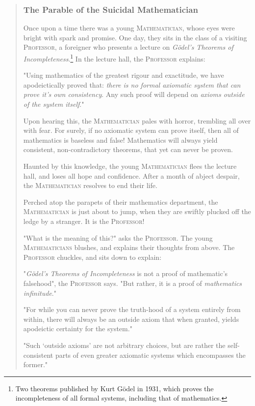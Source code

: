 \begin{quote}
  \subsubsection*{The Parable of the Suicidal Mathematician}
  Once upon a time there was a young \textsc{Mathematician}, whose eyes were bright with spark and promise. One day, they sits in the class of a visiting \textsc{Professor}, a foreigner who presents a lecture on \emph{Gödel's Theorems of Incompleteness}.\footnote{Two theorems published by Kurt Gödel in 1931, which proves the incompleteness of all formal systems, including that of mathematics.} In the lecture hall, the \textsc{Professor} explains:

  "Using mathematics of the greatest rigour and exactitude, we have apodeictically proved that: \emph{there is no formal axiomatic system that can prove it's own consistency}. Any such proof will depend on \emph{axioms outside of the system itself}."

  Upon hearing this, the \textsc{Mathematician} pales with horror, trembling all over with fear. For surely, if no axiomatic system can prove itself, then all of mathematics is baseless and false! Mathematics will always yield consistent, non-contradictory theorems, that yet can never be proven.

  Haunted by this knowledge, the young \textsc{Mathematician} flees the lecture hall, and loses all hope and confidence. After a month of abject despair, the \textsc{Mathematician} resolves to end their life.

  Perched atop the parapets of their mathematics department, the \textsc{Mathematician} is just about to jump, when they are swiftly plucked off the ledge by a stranger. It is the \textsc{Professor}!

  "What is the meaning of this?" asks the \textsc{Professor}. The young \textsc{Mathematicians} blushes, and explains their thoughts from above. The \textsc{Professor} chuckles, and sits down to explain:

  "\emph{Gödel's Theorems of Incompleteness} is not a proof of mathematic's falsehood", the \textsc{Professor} says. "But rather, it is a proof of \emph{mathematics infinitude}."

  "For while you can never prove the truth-hood of a system entirely from within, there will always be an outside axiom that when granted, yields apodeictic certainty for the system."

  "Such `outside axioms' are not arbitrary choices, but are rather the self-consistent parts of even greater axiomatic systems which encompasses the former."


\end{quote}
